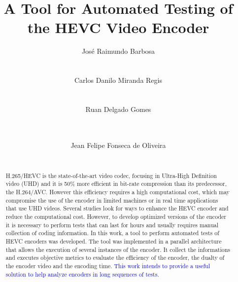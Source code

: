 \documentclass{acm_proc_article-sp}
\begin{document}
\title{A Tool for Automated Testing of the HEVC Video Encoder}


\author{
\alignauthor
José Raimundo Barbosa\\
       \\
       \\
\alignauthor
Carlos Danilo Miranda Regis\\
       \\
       \\
\alignauthor
Ruan Delgado Gomes\\
       \\
       \\
\and %
\alignauthor
Jean Felipe Fonseca de Oliveira\\
       \\
}
\maketitle
\begin{abstract}

H.265/HEVC is the state-of-the-art video codec, focusing in Ultra-High Definition video (UHD) and it is 50\% more efficient in bit-rate compression than its predecessor, the H.264/AVC. However this efficiency requires a high computational cost, which may compromise the use of the encoder in limited machines or in real time applications that use UHD videos. Several studies look for ways to enhance the HEVC encoder and reduce the computational cost. However, to develop optimized versions of the encoder it is necessary to perform tests that can last for hours and usually requires manual collection of coding information.  In this work, a tool to perform automated tests of HEVC encoders  was developed. The tool was implemented in a parallel architecture that allows the execution of several instances of the encoder. It collect the informations and executes objective metrics to evaluate the efficiency of the encoder, the dualty of the encoder video and the encoding time. \textcolor{blue}{This work intends to provide a useful solution to help analyze encoders in long sequences of tests}.

\end{abstract}
\end{document}
